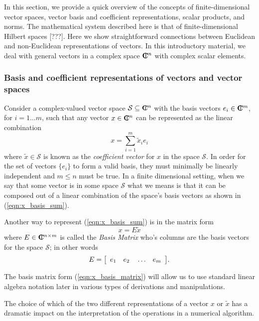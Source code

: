 In this section, we provide a quick overview of the concepts of
finite-dimensional vector spaces, vector basis and coefficient
representations, scalar products, and norms.  The mathematical system
described here is that of finite-dimensional Hilbert spaces [???].  Here we
show straightforward connections between Euclidean and non-Euclidean
representations of vectors.  In this introductory material, we deal with
general vectors in a complex space $\CPLX^n$ with complex scalar elements.

\subsubsection{Basis and coefficient representations of vectors and vector spaces}

Consider a complex-valued vector space $\mathcal{S} {}\subseteq {}\CPLX^n$ with
the basis vectors $e_i\in\CPLX^m$, for $i=1\ldots{}m$, such that any vector
$x\in\CPLX^n$ can be represented as the linear combination
%
\begin{equation}
x = \sum_{i=1}^{m} \tilde{x}_i e_i
\label{eqn:x_basis_sum}
\end{equation}
%
where $\tilde{x}\in\mathcal{S}$ is known as the {}\textit{coefficient vector}
for $x$ in the space $\mathcal{S}$.  In order for the set of vectors $\{e_i\}$
to form a valid basis, they must minimally be linearly independent and $m
{}\le n$ must be true.  In a finite dimensional setting, when we say that some
vector is in some space $\mathcal{S}$ what we means is that it can be composed
out of a linear combination of the space's basis vectors as shown in
(\ref{eqn:x_basis_sum}).

Another way to represent (\ref{eqn:x_basis_sum}) is in the matrix form
%
\begin{equation}
x = E \tilde{x}
\label{eqn:x_basis_matrix}
\end{equation}
%
where $E\in\CPLX^{n\times{}m}$ is called the {}\textit{Basis Matrix} who's
columns are the basis vectors for the space $\mathcal{S}$; in other words
%
\begin{equation}
E = {\bmat{cccc} e_1 & e_2 & {}\ldots & e_m {}\emat}.
\end{equation}
%

The basis matrix form (\ref{eqn:x_basis_matrix}) will allow us to use standard
linear algebra notation later in various types of derivations and
manipulations.

The choice of which of the two different representations of a vector $x$ or
$\tilde{x}$ has a dramatic impact on the interpretation of the operations in
a numerical algorithm.


